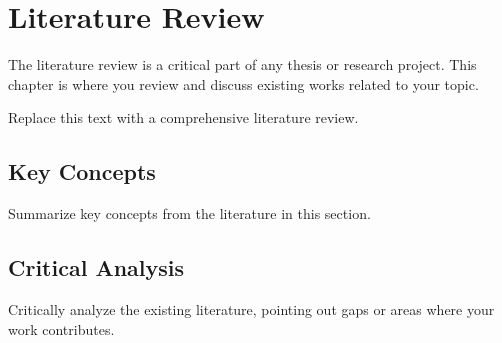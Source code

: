 \chapter{Literature Review}

The literature review is a critical part of any thesis or research project. This chapter is where you review and discuss existing works related to your topic.

Replace this text with a comprehensive literature review.

\section{Key Concepts}

Summarize key concepts from the literature in this section.

\section{Critical Analysis}

Critically analyze the existing literature, pointing out gaps or areas where your work contributes.

